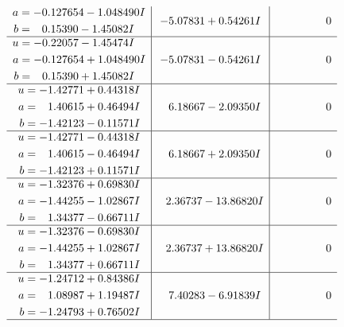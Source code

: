 \documentclass[1p]{elsarticle_modified}
\theoremstyle{definition}
\begin{document}
$$\begin{array}{c|c|c}
\begin{aligned}
a &= -0.127654 - 1.048490 I \\
b &= \phantom{-}0.15390 - 1.45082 I\end{aligned}
 & -5.07831 + 0.54261 I & \phantom{-0.000000 } 0 \\ \hline\begin{aligned}
u &= -0.22057 - 1.45474 I \\
a &= -0.127654 + 1.048490 I \\
b &= \phantom{-}0.15390 + 1.45082 I\end{aligned}
 & -5.07831 - 0.54261 I & \phantom{-0.000000 } 0 \\ \hline\begin{aligned}
u &= -1.42771 + 0.44318 I \\
a &= \phantom{-}1.40615 + 0.46494 I \\
b &= -1.42123 - 0.11571 I\end{aligned}
 & \phantom{-}6.18667 - 2.09350 I & \phantom{-0.000000 } 0 \\ \hline\begin{aligned}
u &= -1.42771 - 0.44318 I \\
a &= \phantom{-}1.40615 - 0.46494 I \\
b &= -1.42123 + 0.11571 I\end{aligned}
 & \phantom{-}6.18667 + 2.09350 I & \phantom{-0.000000 } 0 \\ \hline\begin{aligned}
u &= -1.32376 + 0.69830 I \\
a &= -1.44255 - 1.02867 I \\
b &= \phantom{-}1.34377 - 0.66711 I\end{aligned}
 & \phantom{-}2.36737 - 13.86820 I & \phantom{-0.000000 } 0 \\ \hline\begin{aligned}
u &= -1.32376 - 0.69830 I \\
a &= -1.44255 + 1.02867 I \\
b &= \phantom{-}1.34377 + 0.66711 I\end{aligned}
 & \phantom{-}2.36737 + 13.86820 I & \phantom{-0.000000 } 0 \\ \hline\begin{aligned}
u &= -1.24712 + 0.84386 I \\
a &= \phantom{-}1.08987 + 1.19487 I \\
b &= -1.24793 + 0.76502 I\end{aligned}
 & \phantom{-}7.40283 - 6.91839 I & \phantom{-0.000000 } 0\\
 \hline 

\end{array}$$
\end{document}

